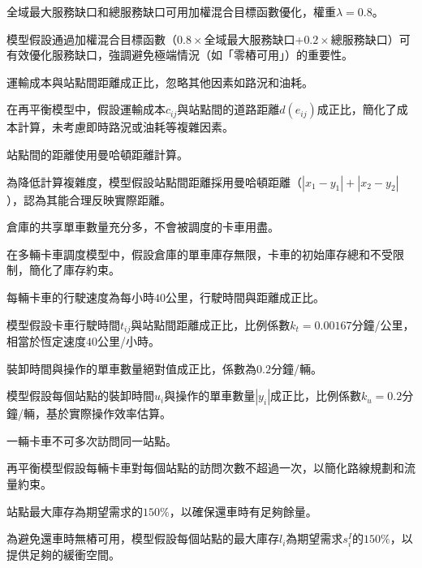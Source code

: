 \begin{assumption}
全域最大服務缺口和總服務缺口可用加權混合目標函數優化，權重\(\lambda=0.8\)。
\end{assumption}
\begin{explanation}
模型假設通過加權混合目標函數（\(0.8\times\)全域最大服務缺口+\(0.2\times\)總服務缺口）可有效優化服務缺口，強調避免極端情況（如「零樁可用」）的重要性。
\end{explanation}
\begin{assumption}
運輸成本與站點間距離成正比，忽略其他因素如路況和油耗。
\end{assumption}
\begin{explanation}
在再平衡模型中，假設運輸成本\(c_{ij}\)與站點間的道路距離\(d(e_{ij})\)成正比，簡化了成本計算，未考慮即時路況或油耗等複雜因素。
\end{explanation}
\begin{assumption}
站點間的距離使用曼哈頓距離計算。
\end{assumption}
\begin{explanation}
為降低計算複雜度，模型假設站點間距離採用曼哈頓距離（\(|x_1 - y_1| + |x_2 - y_2|\)），認為其能合理反映實際距離。
\end{explanation}
\begin{assumption}
倉庫的共享單車數量充分多，不會被調度的卡車用盡。
\end{assumption}
\begin{explanation}
在多輛卡車調度模型中，假設倉庫的單車庫存無限，卡車的初始庫存總和不受限制，簡化了庫存約束。
\end{explanation}
\begin{assumption}
每輛卡車的行駛速度為每小時\(40\)公里，行駛時間與距離成正比。
\end{assumption}
\begin{explanation}
模型假設卡車行駛時間\(t_{ij}\)與站點間距離成正比，比例係數\(k_t=0.00167\)分鐘/公里，相當於恆定速度\(40\)公里/小時。
\end{explanation}
\begin{assumption}
裝卸時間與操作的單車數量絕對值成正比，係數為\(0.2\)分鐘/輛。
\end{assumption}
\begin{explanation}
模型假設每個站點的裝卸時間\(u_i\)與操作的單車數量\(|y_i|\)成正比，比例係數\(k_u=0.2\)分鐘/輛，基於實際操作效率估算。
\end{explanation}
\begin{assumption}
一輛卡車不可多次訪問同一站點。
\end{assumption}
\begin{explanation}
再平衡模型假設每輛卡車對每個站點的訪問次數不超過一次，以簡化路線規劃和流量約束。
\end{explanation}
\begin{assumption}
站點最大庫存為期望需求的\(150\%\)，以確保還車時有足夠餘量。
\end{assumption}
\begin{explanation}
為避免還車時無樁可用，模型假設每個站點的最大庫存\(l_i\)為期望需求\(s_i^I\)的\(150\%\)，以提供足夠的緩衝空間。
\end{explanation}

